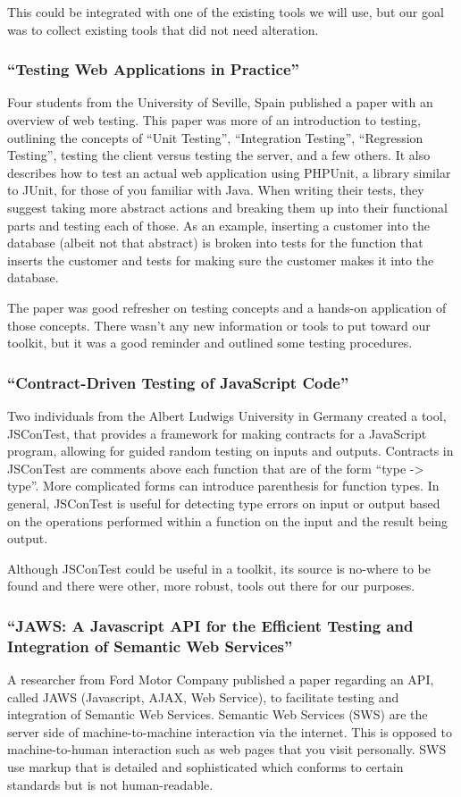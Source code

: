\documentclass[11pt]{article}
\begin{document}
This could be integrated with one of the existing tools we will use, but our goal was to collect existing tools that did not need alteration.

\subsubsection{``Testing Web Applications in Practice'' \cite{TestingInPractice}}
Four students from the University of Seville, Spain published a paper with an overview of web testing. This paper was more of an introduction to testing, outlining the concepts of “Unit Testing”, “Integration Testing”, “Regression Testing”, testing the client versus testing the server, and a few others. It also describes how to test an actual web application using PHPUnit, a library similar to JUnit, for those of you familiar with Java. When writing their tests, they suggest taking more abstract actions and breaking them up into their functional parts and testing each of those. As an example, inserting a customer into the database (albeit not that abstract) is broken into tests for the function that inserts the customer and tests for making sure the customer makes it into the database.

The paper was good refresher on testing concepts and a hands-on application of those concepts. There wasn't any new information or tools to put toward our toolkit, but it was a good reminder and outlined some testing procedures.

\subsubsection{``Contract-Driven Testing of JavaScript Code'' \cite{ContractDrivenTesting}}
Two individuals from the Albert Ludwigs University in Germany created a tool, JSConTest, that provides a framework for making contracts for a JavaScript program, allowing for guided random testing on inputs and outputs. Contracts in JSConTest are comments above each function that are of the form ``type -> type''. More complicated forms can introduce parenthesis for function types. In general, JSConTest is useful for detecting type errors on input or output based on the operations performed within a function on the input and the result being output. 

Although JSConTest could be useful in a toolkit, its source is no-where to be found and there were other, more robust, tools out there for our purposes.

\subsubsection{``JAWS: A Javascript API for the Efficient Testing and Integration of Semantic Web Services'' \cite{JAWS}}
A researcher from Ford Motor Company published a paper regarding an API, called JAWS (Javascript, AJAX, Web Service), to facilitate testing and integration of Semantic Web Services. Semantic Web Services (SWS) are the server side of machine-to-machine interaction via the internet. This is opposed to machine-to-human interaction such as web pages that you visit personally. SWS use markup that is detailed and sophisticated which conforms to certain standards but is not human-readable.
\end{document}
